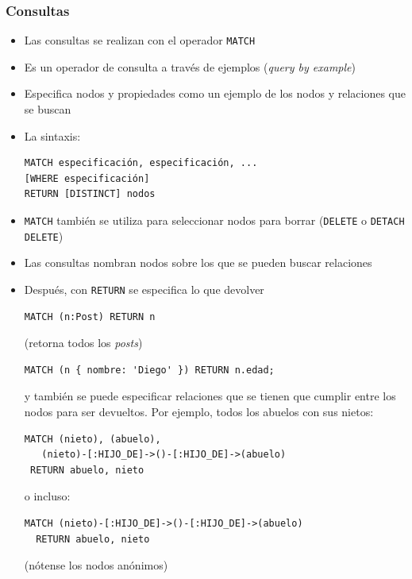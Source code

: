 \documentclass[14pt]{beamer}
\begin{document}
\begin{frame}
  \frametitle{Consultas}
  \begin{itemize}
  \item Las consultas se realizan con el operador {\tt MATCH}
  \item Es un operador de consulta a través de ejemplos ({\em query by
      example})
\item Especifica nodos y propiedades como un ejemplo de los nodos y
  relaciones que se buscan
\item La sintaxis:

\begin{lstlisting}[language=cypher]
MATCH especificación, especificación, ...
[WHERE especificación]
RETURN [DISTINCT] nodos
\end{lstlisting}

\item {\tt MATCH} también se utiliza para seleccionar nodos para borrar
  ({\tt DELETE} o {\tt DETACH DELETE})

  \item Las consultas nombran nodos sobre los que se pueden buscar
    relaciones
\item Después, con {\tt RETURN} se especifica lo que devolver
\begin{lstlisting}[language=cypher]
MATCH (n:Post) RETURN n
\end{lstlisting}
(retorna todos los {\em posts})

\begin{lstlisting}[language=cypher]
MATCH (n { nombre: 'Diego' }) RETURN n.edad;
\end{lstlisting}

y también se puede especificar relaciones que se tienen que cumplir entre
los nodos para ser devueltos. Por ejemplo, todos los abuelos con sus
nietos:

\begin{lstlisting}[language=cypher]
MATCH (nieto), (abuelo),
   (nieto)-[:HIJO_DE]->()-[:HIJO_DE]->(abuelo)
 RETURN abuelo, nieto
\end{lstlisting}
o incluso:
\begin{lstlisting}[language=cypher]
MATCH (nieto)-[:HIJO_DE]->()-[:HIJO_DE]->(abuelo)
  RETURN abuelo, nieto
\end{lstlisting}

(nótense los nodos anónimos)
  \end{itemize}
\end{frame}
\end{document}
